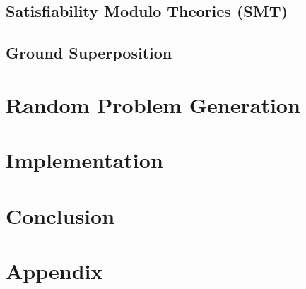 \documentclass[12pt]{llncs}
\begin{document}
\subsection{Satisfiability Modulo Theories (SMT)}\label{sec:smt}





\subsection{Ground Superposition}\label{sec:qf}






\section{Random Problem Generation}\label{sec:satfo}



\section{Implementation}\label{sec:implementation}



\section{Conclusion}










\appendix
\section{Appendix}

\end{document}
